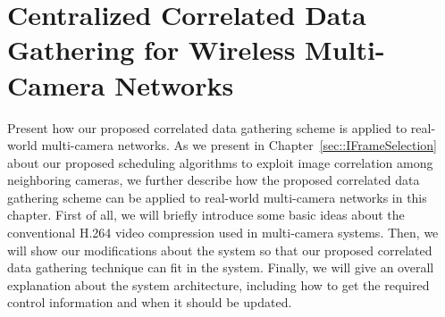 \section{Centralized Correlated Data Gathering for Wireless Multi-Camera Networks}
\label{sec::protocolDesign}
{\color{red} Present how our proposed correlated data gathering scheme is applied to real-world multi-camera networks.}
As we present in Chapter~\ref{sec::IFrameSelection} about our proposed scheduling algorithms to exploit image correlation among neighboring cameras, we further describe how the proposed correlated data gathering scheme can be applied to real-world multi-camera networks in this chapter.
First of all, we will briefly introduce some basic ideas about the conventional H.264 video compression used in multi-camera systems.
Then, we will show our modifications about the system so that our proposed correlated data gathering technique can fit in the system.
Finally, we will give an overall explanation about the system architecture, including how to get the required control information and when it should be updated.
%
%
